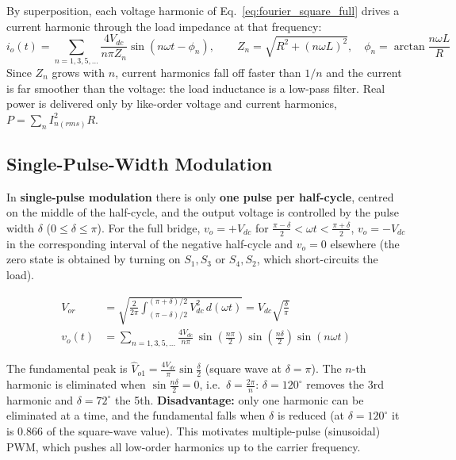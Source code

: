 \documentclass[11pt,a4paper]{article}
\let\origsubsection\subsection
\renewcommand{\subsection}{\Needspace{7\baselineskip}\origsubsection}
\begin{document}
By superposition, each voltage harmonic of Eq.~\eqref{eq:fourier_square_full} drives a current harmonic through the load impedance at that frequency:
\begin{equation}
i_o(t) = \sum_{n=1,3,5,\dots}\frac{4V_{dc}}{n\pi Z_n}\sin(n\omega t - \phi_n),\qquad Z_n = \sqrt{R^2 + (n\omega L)^2},\quad \phi_n = \arctan\frac{n\omega L}{R}
\end{equation}
Since $Z_n$ grows with $n$, current harmonics fall off faster than $1/n$ and the current is far smoother than the voltage: the load inductance is a low-pass filter. Real power is delivered only by like-order voltage and current harmonics, $P = \sum_n I_{n(rms)}^2 R$.

\subsection{Single-Pulse-Width Modulation}

In \textbf{single-pulse modulation} there is only \textbf{one pulse per half-cycle}, centred on the middle of the half-cycle, and the output voltage is controlled by the pulse width $\delta$ ($0 \le \delta \le \pi$). For the full bridge, $v_o = +V_{dc}$ for $\frac{\pi-\delta}{2} < \omega t < \frac{\pi+\delta}{2}$, $v_o = -V_{dc}$ in the corresponding interval of the negative half-cycle and $v_o = 0$ elsewhere (the zero state is obtained by turning on $S_1, S_3$ or $S_4, S_2$, which short-circuits the load).
\begin{formulabox}
\begin{align}
V_{or} &= \sqrt{\frac{2}{2\pi}\int_{(\pi-\delta)/2}^{(\pi+\delta)/2} V_{dc}^2\,d(\omega t)} = V_{dc}\sqrt{\frac{\delta}{\pi}} \\
v_o(t) &= \sum_{n=1,3,5,\dots}\frac{4V_{dc}}{n\pi}\,\sin\!\left(\frac{n\pi}{2}\right)\sin\!\left(\frac{n\delta}{2}\right)\sin(n\omega t)
\label{eq:single_pulse}
\end{align}
\end{formulabox}
The fundamental peak is $\hat V_{o1} = \frac{4V_{dc}}{\pi}\sin\frac{\delta}{2}$ (square wave at $\delta = \pi$). The $n$-th harmonic is eliminated when $\sin\frac{n\delta}{2} = 0$, i.e.\ $\delta = \frac{2\pi}{n}$: $\delta = 120^\circ$ removes the 3rd harmonic and $\delta = 72^\circ$ the 5th. \textbf{Disadvantage:} only one harmonic can be eliminated at a time, and the fundamental falls when $\delta$ is reduced (at $\delta = 120^\circ$ it is $0.866$ of the square-wave value). This motivates multiple-pulse (sinusoidal) PWM, which pushes all low-order harmonics up to the carrier frequency.
\end{document}
